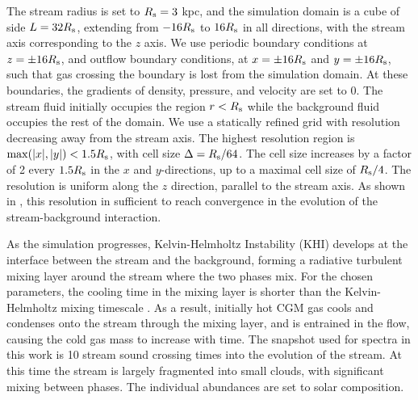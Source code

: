 \documentclass[fleqn,usenatbib]{mnras}
\begin{document}
The stream radius is set to $R_{\rm s}=3$ kpc, and the simulation domain is a cube of side $L=32R_{\rm s}$, extending from $-16R_{\rm s}$ to $16R_{\rm s}$ in all directions, with the stream axis corresponding to the $z$ axis.
We use periodic boundary conditions at $z=\pm 16R_{\rm s}$, and outflow boundary conditions, at $x=\pm 16R_{\rm s}$ and $y=\pm 16R_{\rm s}$, such that gas crossing the boundary is lost from the simulation domain.
At these boundaries, the gradients of density, pressure, and velocity are set to 0.
The stream fluid initially occupies the region $r<R_{\rm s}$ while the background fluid occupies the rest of the domain.
We use a statically refined grid with resolution decreasing away from the stream axis. The highest resolution region is ${\rm max}(|x|,|y|)<1.5R_{\rm s}$, with cell size $\Delta=R_{\rm s}/64$.
The cell size increases by a factor of 2 every $1.5R_{\rm s}$ in the $x$ and $y$-directions, up to a maximal cell size of $R_{\rm s}/4$.
The resolution is uniform along the $z$ direction, parallel to the stream axis. As shown in \cite{Mandelker2020a}, this resolution in sufficient to reach convergence in the evolution of the stream-background interaction.

As the simulation progresses, Kelvin-Helmholtz Instability (KHI) develops at the interface between the stream and the background, forming a radiative turbulent mixing layer around the stream where the two phases mix. For the chosen parameters, the cooling time in the mixing layer is shorter than the Kelvin-Helmholtz mixing timescale \citep{Mandelker2020a}. As a result, initially hot CGM gas cools and condenses onto the stream through the mixing layer, and is entrained in the flow, causing the cold gas mass to increase with time. The snapshot used for spectra in this work is 10 stream sound crossing times into the evolution of the stream. At this time the stream is largely fragmented into small clouds, with significant mixing between phases.
The individual abundances are set to solar composition.
\end{document}
